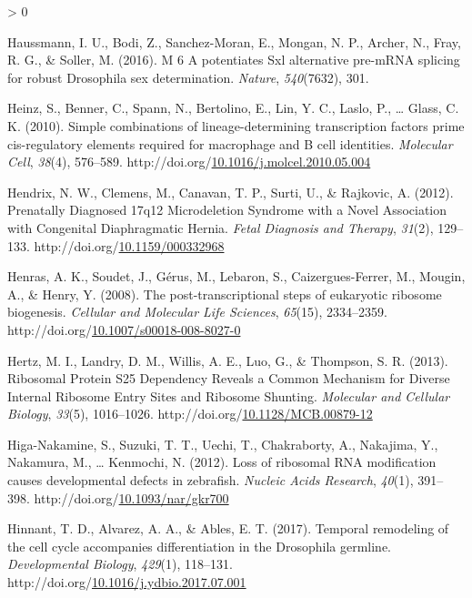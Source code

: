 \documentclass[12pt,oneside]{reedthesis}
\newlength{\cslhangindent}
\newenvironment{CSLReferences}[2] %
 {%
  \setlength{\parindent}{0pt}
  \ifodd #1 \everypar{\setlength{\hangindent}{\cslhangindent}}\ignorespaces\fi
  \ifnum #2 > 0
  \setlength{\parskip}{#2\baselineskip}
  \fi
 }%
 {}
\begin{document}
\begin{CSLReferences}{1}{0}
\leavevmode\hypertarget{ref-Haussmann2016}{}%
Haussmann, I. U., Bodi, Z., Sanchez-Moran, E., Mongan, N. P., Archer, N., Fray, R. G., \& Soller, M. (2016). M 6 {A} potentiates {Sxl} alternative pre-{mRNA} splicing for robust {Drosophila} sex determination. \emph{Nature}, \emph{540}(7632), 301.

\leavevmode\hypertarget{ref-heinzSimpleCombinationsLineagedetermining2010}{}%
Heinz, S., Benner, C., Spann, N., Bertolino, E., Lin, Y. C., Laslo, P., \ldots{} Glass, C. K. (2010). Simple combinations of lineage-determining transcription factors prime cis-regulatory elements required for macrophage and {B} cell identities. \emph{Molecular Cell}, \emph{38}(4), 576--589. http://doi.org/\href{https://doi.org/10.1016/j.molcel.2010.05.004}{10.1016/j.molcel.2010.05.004}

\leavevmode\hypertarget{ref-hendrixPrenatallyDiagnosed17q122012}{}%
Hendrix, N. W., Clemens, M., Canavan, T. P., Surti, U., \& Rajkovic, A. (2012). Prenatally {Diagnosed} 17q12 {Microdeletion Syndrome} with a {Novel Association} with {Congenital Diaphragmatic Hernia}. \emph{Fetal Diagnosis and Therapy}, \emph{31}(2), 129--133. http://doi.org/\href{https://doi.org/10.1159/000332968}{10.1159/000332968}

\leavevmode\hypertarget{ref-Henras2008c}{}%
Henras, A. K., Soudet, J., Gérus, M., Lebaron, S., Caizergues-Ferrer, M., Mougin, A., \& Henry, Y. (2008). The post-transcriptional steps of eukaryotic ribosome biogenesis. \emph{Cellular and Molecular Life Sciences}, \emph{65}(15), 2334--2359. http://doi.org/\href{https://doi.org/10.1007/s00018-008-8027-0}{10.1007/s00018-008-8027-0}

\leavevmode\hypertarget{ref-hertzRibosomalProteinS252013}{}%
Hertz, M. I., Landry, D. M., Willis, A. E., Luo, G., \& Thompson, S. R. (2013). Ribosomal {Protein S25 Dependency Reveals} a {Common Mechanism} for {Diverse Internal Ribosome Entry Sites} and {Ribosome Shunting}. \emph{Molecular and Cellular Biology}, \emph{33}(5), 1016--1026. http://doi.org/\href{https://doi.org/10.1128/MCB.00879-12}{10.1128/MCB.00879-12}

\leavevmode\hypertarget{ref-Higa-Nakamine2012o}{}%
Higa-Nakamine, S., Suzuki, T. T., Uechi, T., Chakraborty, A., Nakajima, Y., Nakamura, M., \ldots{} Kenmochi, N. (2012). Loss of ribosomal {RNA} modification causes developmental defects in zebrafish. \emph{Nucleic Acids Research}, \emph{40}(1), 391--398. http://doi.org/\href{https://doi.org/10.1093/nar/gkr700}{10.1093/nar/gkr700}

\leavevmode\hypertarget{ref-hinnantTemporalRemodelingCell2017}{}%
Hinnant, T. D., Alvarez, A. A., \& Ables, E. T. (2017). Temporal remodeling of the cell cycle accompanies differentiation in the {Drosophila} germline. \emph{Developmental Biology}, \emph{429}(1), 118--131. http://doi.org/\href{https://doi.org/10.1016/j.ydbio.2017.07.001}{10.1016/j.ydbio.2017.07.001}


\end{CSLReferences}
\end{document}

